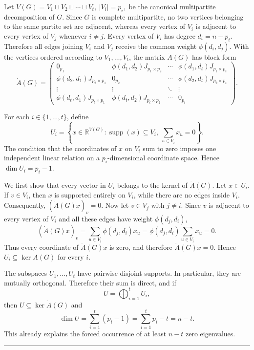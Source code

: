 \documentclass[12pt,twoside]{article}
\renewenvironment{proof}{{\noindent\bfseries Proof.}}{\qed}
\def\qed{\nolinebreak\hfill\rule{.2cm}{.2cm}\par\addvspace{.5cm}}
\begin{document}
\begin{proof}
	Let
	$
	V(G)=V_1\sqcup V_2\sqcup\cdots\sqcup V_t,
	~ |V_i|=p_i,
	$
	be the canonical multipartite decomposition of $G$. Since $G$ is complete multipartite, no two vertices belonging to the same partite set are adjacent, whereas every vertex of $V_i$ is adjacent to every vertex of $V_j$ whenever $i\neq j$. Every vertex of $V_i$ has degree
	$
	d_i=n-p_i.
	$
	Therefore all edges joining $V_i$ and $V_j$ receive the common weight
	$
	\phi(d_i,d_j).
	$
	With the vertices ordered according to $V_1,\ldots,V_t$, the matrix $\dot A(G)$ has block form
	$$
	\dot A(G)
	=
	\begin{pmatrix}
		0_{p_1}
		&
		\phi(d_1,d_2)J_{p_1\times p_2}
		&
		\cdots
		&
		\phi(d_1,d_t)J_{p_1\times p_t}
		\\
		\phi(d_2,d_1)J_{p_2\times p_1}
		&
		0_{p_2}
		&
		\cdots
		&
		\phi(d_2,d_t)J_{p_2\times p_t}
		\\
		\vdots
		&
		\vdots
		&
		\ddots
		&
		\vdots
		\\
		\phi(d_t,d_1)J_{p_t\times p_1}
		&
		\phi(d_t,d_2)J_{p_t\times p_2}
		&
		\cdots
		&
		0_{p_t}
	\end{pmatrix}.
	$$
	
	For each $i\in\{1,\ldots,t\}$, define
	$$
	U_i
	=
	\left\{
	x\in\mathbb R^{V(G)}:
	\operatorname{supp}(x)\subseteq V_i,\ 
	\sum_{u\in V_i}x_u=0
	\right\}.
	$$
	The condition that the coordinates of $x$ on $V_i$ sum to zero imposes one independent linear relation on a $p_i$-dimensional coordinate space. Hence
	$
	\dim U_i=p_i-1.
	$
	
	We first show that every vector in $U_i$ belongs to the kernel of $\dot A(G)$. Let $x\in U_i$. If $v\in V_i$, then $x$ is supported entirely on $V_i$, while there are no edges inside $V_i$. Consequently,
	$
	(\dot A(G)x)_v=0.
	$
	Now let $v\in V_j$ with $j\neq i$. Since $v$ is adjacent to every vertex of $V_i$ and all these edges have weight $\phi(d_j,d_i)$,
	$$
	(\dot A(G)x)_v
	=
	\sum_{u\in V_i}\phi(d_j,d_i)x_u
	=
	\phi(d_j,d_i)\sum_{u\in V_i}x_u
	=
	0.
	$$
	Thus every coordinate of $\dot A(G)x$ is zero, and therefore
	$
	\dot A(G)x=0.
	$
	Hence
	$
	U_i\subseteq\ker\dot A(G)
	$
	for every $i$.
	
	The subspaces $U_1,\ldots,U_t$ have pairwise disjoint supports. In particular, they are mutually orthogonal. Therefore their sum is direct, and if
	$$
	U=\bigoplus_{i=1}^t U_i,
	$$
	then
	$
	U\subseteq\ker\dot A(G)
	$
	and
	$$
	\dim U
	=
	\sum_{i=1}^t(p_i-1)
	=
	\sum_{i=1}^t p_i-t
	=
	n-t.
	$$
	This already explains the forced occurrence of at least $n-t$ zero eigenvalues.
	

\end{proof}
\end{document}
